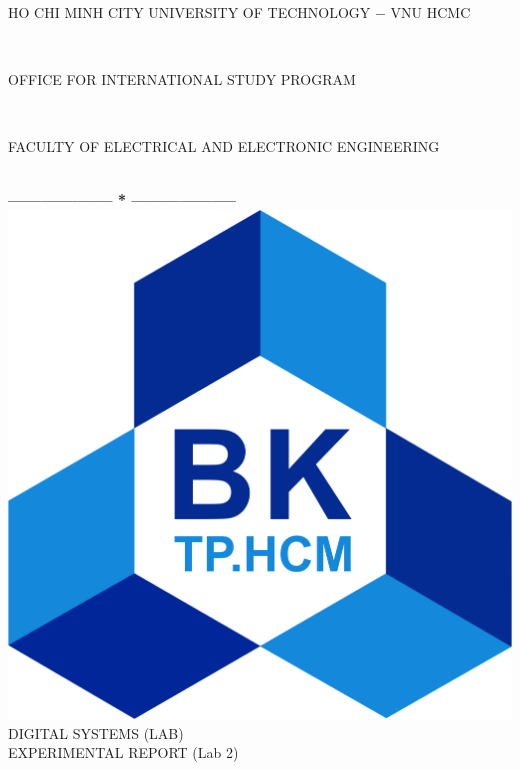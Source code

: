 \documentclass[13pt,a4paper]{report}
\begin{document}
\fontsize{13pt}{18pt}\selectfont
\begin{titlepage}
\thispagestyle{empty}
\thisfancypage{%
\setlength{\fboxsep}{0pt}%
\fbox}{} %
\

\begin{center}
\begin{large}
HO CHI MINH CITY UNIVERSITY OF TECHNOLOGY $-$ VNU HCMC
\end{large} \\
\begin{large}
OFFICE FOR INTERNATIONAL STUDY PROGRAM
\end{large} \\
\begin{large}
FACULTY OF ELECTRICAL AND ELECTRONIC ENGINEERING
\end{large} \\
\textbf{--------------------  *  --------------------}\\[4cm]
\includegraphics[scale=0.1]{logobk.png}\\[1cm]
{\fontsize{20pt}{1}\selectfont DIGITAL SYSTEMS (LAB)}\\
{\fontsize{20pt}{1}\selectfont EXPERIMENTAL REPORT (Lab 2)}\\[2.5cm]
\end{center}


\end{titlepage}
\end{document}
